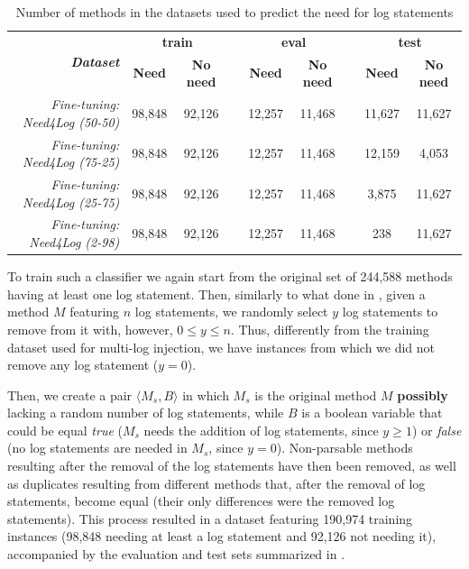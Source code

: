 \begin{table}[h!]
	\centering
	\scriptsize
	\caption{Number of methods in the datasets used to predict the need for log statements\vspace{-0.3cm}}
	\begin{tabular}{rcccccccc}
		\toprule
		\multirow{2}{*}{\textit{\textbf{Dataset}}} & \multicolumn{2}{c}{\textbf{train}} & \textbf{} & \multicolumn{2}{c}{\textbf{eval}}  & \textbf{} & \multicolumn{2}{c}{\textbf{test}}  \\ \cline{2-3} \cline{5-6} \cline{8-9} 
		& \textbf{Need} & \textbf{No need}   & \textbf{} & \textbf{Need} & \textbf{No need}   & \textbf{} & \textbf{Need} & \textbf{No need}   \\ \midrule
		\textit{Fine-tuning: Need4Log (50-50)}         & 98,848        & 92,126             &           & 12,257        & 11,468             &           & 11,627        &  11,627            \\
		\textit{Fine-tuning: Need4Log (75-25)}         & 98,848        & 92,126             &           & 12,257        & 11,468             &           & 12,159        &  4,053             \\
		\textit{Fine-tuning: Need4Log (25-75)}         & 98,848        & 92,126             &           & 12,257        & 11,468             &           & 3,875         &  11,627            \\ 
		\textit{Fine-tuning: Need4Log (2-98)}         & 98,848        & 92,126             &           & 12,257        & 11,468             &           & 238         &  11,627            \\ 
		\bottomrule
	\end{tabular}
	\label{tab:ds-summary-2}
	\vspace{-0.3cm}
\end{table}

To train such a classifier we again start from the original set of 244,588 \java methods having at least one log statement. Then, similarly to what done in , given a method $M$ featuring $n$ log statements, we randomly select $y$ log statements to remove from it with, however, $0 \leq y \leq n$. Thus, differently from the training dataset used for multi-log injection, we have instances from which we did not remove any log statement ($y=0$). 

Then, we create a pair $\langle M_s, B \rangle$ in which $M_s$ is the original method $M$ \textbf{possibly} lacking a random number of log statements, while $B$ is a boolean variable that could be equal \emph{true} (\ie $M_s$ needs the addition of log statements, since $y \geq 1$) or \emph{false} (\ie no log statements are needed in $M_s$, since $y = 0$). Non-parsable methods resulting after the removal of the log statements have then been removed, as well as duplicates resulting from different methods that, after the removal of log statements, become equal (\ie their only differences were the removed log statements). This process resulted in a dataset featuring 190,974 training instances (98,848 needing at least a log statement and 92,126 not needing it), accompanied by the evaluation and test sets summarized in .

